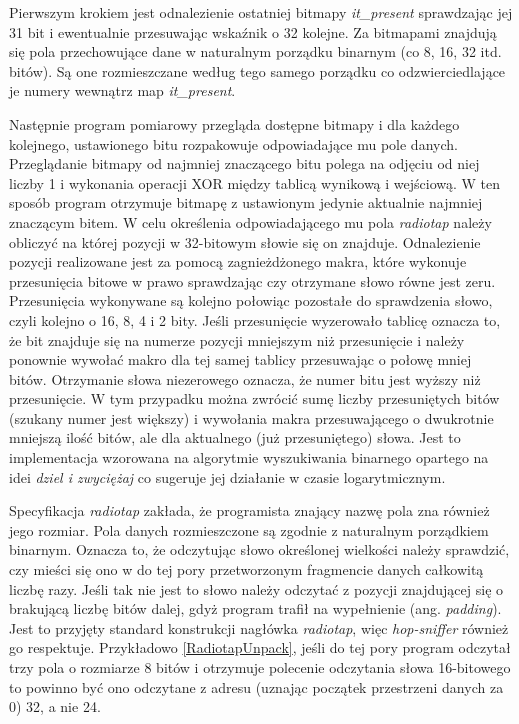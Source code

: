 Pierwszym krokiem jest odnalezienie ostatniej bitmapy \emph{it\_present} sprawdzając jej 31 bit i ewentualnie przesuwając wskaźnik o 32 kolejne. Za bitmapami znajdują się pola przechowujące dane w naturalnym porządku binarnym (co 8, 16, 32 itd. bitów). Są one rozmieszczane według tego samego porządku co odzwierciedlające je numery wewnątrz map \emph{it\_present}.

Następnie program pomiarowy przegląda dostępne bitmapy i dla każdego kolejnego, ustawionego bitu rozpakowuje odpowiadające mu pole danych. Przeglądanie bitmapy od najmniej znaczącego bitu polega na odjęciu od niej liczby 1 i wykonania operacji XOR między tablicą wynikową i wejściową. W ten sposób program otrzymuje bitmapę z ustawionym jedynie aktualnie najmniej znaczącym bitem. W celu określenia odpowiadającego mu pola \emph{radiotap} należy obliczyć na której pozycji w 32-bitowym słowie się on znajduje. Odnalezienie pozycji realizowane jest za pomocą zagnieżdżonego makra, które wykonuje przesunięcia bitowe w prawo sprawdzając czy otrzymane słowo równe jest zeru. Przesunięcia wykonywane są kolejno połowiąc pozostałe do sprawdzenia słowo, czyli kolejno o 16, 8, 4 i 2 bity. Jeśli przesunięcie wyzerowało tablicę oznacza to, że bit znajduje się na numerze pozycji mniejszym niż przesunięcie i należy ponownie wywołać makro dla tej samej tablicy przesuwając o połowę mniej bitów. Otrzymanie słowa niezerowego oznacza, że numer bitu jest wyższy niż przesunięcie. W tym przypadku można zwrócić sumę liczby przesuniętych bitów (szukany numer jest większy) i wywołania makra przesuwającego o dwukrotnie mniejszą ilość bitów, ale dla aktualnego (już przesuniętego) słowa. Jest to implementacja wzorowana na algorytmie wyszukiwania binarnego opartego na idei \emph{dziel i zwyciężaj} co sugeruje jej działanie w czasie logarytmicznym. 

Specyfikacja \emph{radiotap} zakłada, że programista znający nazwę pola zna również jego rozmiar. Pola danych rozmieszczone są zgodnie z naturalnym porządkiem binarnym. Oznacza to, że odczytując słowo określonej wielkości należy sprawdzić, czy mieści się ono w do tej pory przetworzonym fragmencie danych całkowitą liczbę razy. Jeśli tak nie jest to słowo należy odczytać z pozycji znajdującej się o brakującą liczbę bitów dalej, gdyż program trafił na wypełnienie (ang. \emph{padding}). Jest to przyjęty standard konstrukcji nagłówka \emph{radiotap}, więc \emph{hop-sniffer} również go respektuje. Przykładowo \ref{RadiotapUnpack}, jeśli do tej pory program odczytał trzy pola o rozmiarze 8 bitów i otrzymuje polecenie odczytania słowa 16-bitowego to powinno być ono odczytane z adresu (uznając początek przestrzeni danych za 0) 32, a nie 24. 


